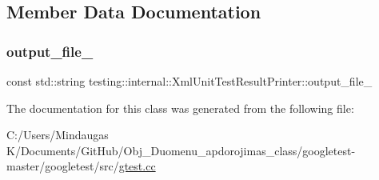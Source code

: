 \subsection{Member Data Documentation}
\mbox{\label{classtesting_1_1internal_1_1_xml_unit_test_result_printer_aa81cc4540d16279f5eb5f7ec9f366ea7}} 
\subsubsection{\texorpdfstring{output\_file\_}{output\_file\_}}
{\footnotesize\ttfamily const std\+::string testing\+::internal\+::\+Xml\+Unit\+Test\+Result\+Printer\+::output\+\_\+file\+\_\+\hspace{0.3cm}{\ttfamily [private]}}



The documentation for this class was generated from the following file\+:\begin{DoxyCompactItemize}
\item 
C\+:/\+Users/\+Mindaugas K/\+Documents/\+Git\+Hub/\+Obj\+\_\+\+Duomenu\+\_\+apdorojimas\+\_\+class/googletest-\/master/googletest/src/\mbox{\hyperlink{googletest-master_2googletest_2src_2gtest_8cc}{gtest.\+cc}}\end{DoxyCompactItemize}
